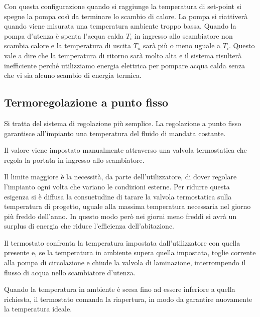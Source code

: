 \documentclass[laurea,oneside,11pt]{USiena_tesiLM}
\begin{document}
Con questa configurazione quando si raggiunge la temperatura di set-point si spegne la pompa così da terminare lo scambio di calore. La pompa si riattiverà quando viene misurata una temperatura ambiente troppo bassa. Quando la pompa d'utenza è spenta l'acqua calda $T_i$ in ingresso allo scambiatore non scambia calore e la temperatura di uscita $T_u$ sarà più o meno uguale a $T_i$. Questo vale a dire che la temperatura di ritorno sarà molto alta e il sistema risulterà inefficiente perché utilizziamo energia elettrica per pompare acqua calda senza che vi sia alcuno scambio di energia termica.


\subsection{Termoregolazione a punto fisso}
Si tratta del sistema di regolazione più semplice. La regolazione a punto fisso garantisce all'impianto una temperatura del fluido di mandata costante. 

Il valore viene impostato manualmente attraverso una valvola termostatica che regola la portata in ingresso allo scambiatore.  

Il limite maggiore è la necessità, da parte dell'utilizzatore, di dover regolare l'impianto ogni volta che variano le condizioni esterne. Per ridurre questa esigenza si è diffusa la consuetudine di tarare la valvola termostatica sulla temperatura di progetto, uguale alla massima temperatura necessaria nel giorno più freddo dell'anno. In questo modo però nei giorni meno freddi si avrà un surplus di energia che riduce l'efficienza dell'abitazione.

Il termostato confronta la temperatura impostata dall'utilizzatore con quella presente e, se la temperatura in ambiente supera quella impostata, toglie corrente alla pompa di circolazione e chiude la valvola di laminazione, interrompendo il flusso di acqua nello scambiatore d'utenza. 

Quando la temperatura in ambiente è scesa fino ad essere inferiore a quella richiesta, il termostato comanda la riapertura, in modo da garantire nuovamente la temperatura ideale.
\end{document}
